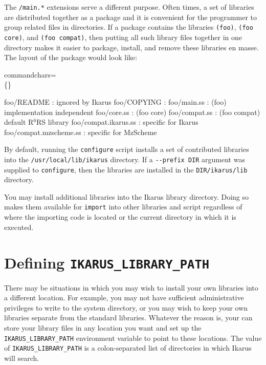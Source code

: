 \documentclass[onecolumn, 12pt, twoside, openright, dvipdfm]{book}
\newcommand{\rnrs}[1]{R$^{\mathrm{#1}}$RS}
\begin{document}
The \verb|/main.*| extensions serve a different purpose.  Often
times, a set of libraries are distributed together as a package and
it is convenient for the programmer to group related files in
directories.  If a package contains the libraries \verb|(foo)|,
\verb|(foo core)|, and \verb|(foo compat)|, then putting all such
library files together in one directory makes it easier to
package, install, and remove these libraries en masse.  The layout
of the package would look like:

 {%
  commandchars=\\\{\}}

\begin{Code}
  foo/README              :              {\textrm{ignored by Ikarus}}
  foo/COPYING             :
  foo/main.ss             : (foo)        {\textrm{implementation independent}}
  foo/core.ss             : (foo core) 
  foo/compat.ss           : (foo compat) {\textrm{default \rnrs{6} library}}
  foo/compat.ikarus.ss    :              {\textrm{specific for Ikarus}}
  foo/compat.mzscheme.ss  :              {\textrm{specific for MzScheme}}
\end{Code}


By default, running the \texttt{configure} script
installs a set of contributed libraries into the
\verb|/usr/local/lib/ikarus| directory.  If a \verb|--prefix DIR|
argument was supplied to \texttt{configure}, then the libraries are
installed in the \verb|DIR/ikarus/lib| directory.  

You may install additional libraries into the Ikarus library
directory.  Doing so makes them available for \texttt{import} into
other libraries and script regardless of where the importing code is
located or the current directory in which it is executed.  

\section{Defining \texttt{IKARUS\_LIBRARY\_PATH}}

There may be situations in which you may wish to install your own
libraries into a different location.  For example, you may not have
sufficient administrative privileges to write to the system
directory, or you may wish to keep your own libraries separate from
the standard libraries.  Whatever the reason is, your can store your
library files in any location you want and set up the
\verb|IKARUS_LIBRARY_PATH| environment variable to point to these
locations.  The value of \verb|IKARUS_LIBRARY_PATH| is a
colon-separated list of directories in which Ikarus will search.
\end{document}
